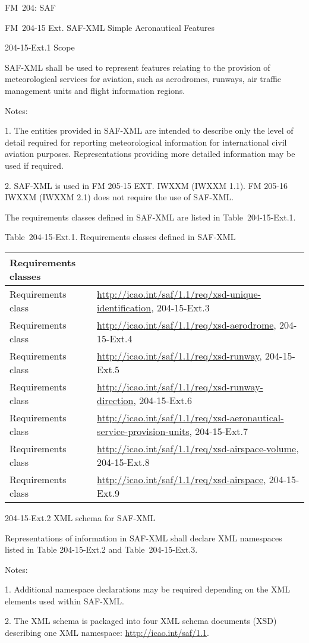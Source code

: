 FM~204: SAF

FM~204-15 Ext. SAF-XML Simple Aeronautical Features

204-15-Ext.1 Scope

SAF-XML shall be used to represent features relating to the provision of meteorological services for aviation, such as aerodromes, runways, air traffic management units and flight information regions.

Notes:

1. The entities provided in SAF-XML are intended to describe only the level of detail required for reporting meteorological information for international civil aviation purposes. Representations providing more detailed information may be used if required.

2. SAF-XML is used in FM 205-15 EXT. IWXXM (IWXXM 1.1). FM 205-16 IWXXM (IWXXM 2.1) does not require the use of SAF-XML.

The requirements classes defined in SAF-XML are listed in Table~204-15-Ext.1.

Table~204-15-Ext.1. Requirements classes defined in SAF-XML

\begin{longtable}[]{@{}ll@{}}
\toprule
Requirements classes &\tabularnewline
\midrule
\endhead
Requirements class & \url{http://icao.int/saf/1.1/req/xsd-unique-identification}, 204-15-Ext.3\tabularnewline
Requirements class & \url{http://icao.int/saf/1.1/req/xsd-aerodrome}, 204-15-Ext.4\tabularnewline
Requirements class & \url{http://icao.int/saf/1.1/req/xsd-runway}, 204-15-Ext.5\tabularnewline
Requirements class & \url{http://icao.int/saf/1.1/req/xsd-runway-direction}, 204-15-Ext.6\tabularnewline
Requirements class & \url{http://icao.int/saf/1.1/req/xsd-aeronautical-service-provision-units}, 204-15-Ext.7\tabularnewline
Requirements class & \url{http://icao.int/saf/1.1/req/xsd-airspace-volume}, 204-15-Ext.8\tabularnewline
Requirements class & \url{http://icao.int/saf/1.1/req/xsd-airspace}, 204-15-Ext.9\tabularnewline
\bottomrule
\end{longtable}

204-15-Ext.2 XML schema for SAF-XML

Representations of information in SAF-XML shall declare XML namespaces listed in Table 204-15-Ext.2 and Table~204-15-Ext.3.

Notes:

1. Additional namespace declarations may be required depending on the XML elements used within SAF-XML.

2. The XML schema is packaged into four XML schema documents (XSD) describing one XML namespace: \url{http://icao.int/saf/1.1}.

